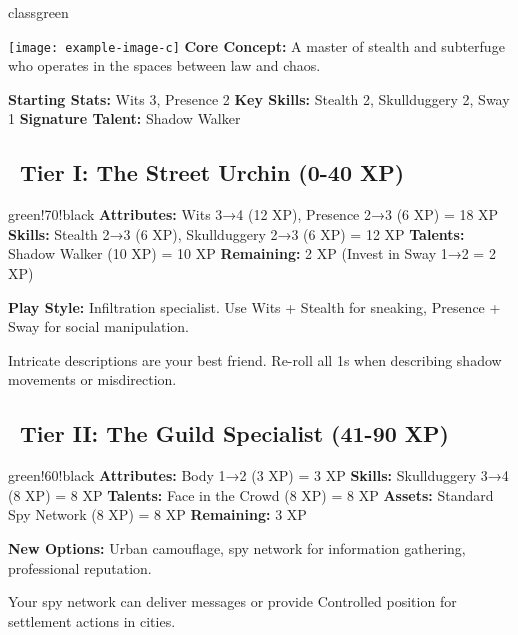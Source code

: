 \documentclass[11pt]{article}
\begin{document}
\newpage

\begin{classguide}{classgreen}
\begin{multicols}{2}
\texttt{[image: example-image-c]}
\columnbreak
\textbf{Core Concept:} A master of stealth and subterfuge who operates in the spaces between law and chaos.

\textbf{Starting Stats:} Wits 3, Presence 2
\textbf{Key Skills:} Stealth 2, Skullduggery 2, Sway 1
\textbf{Signature Talent:} Shadow Walker
\end{multicols}

\subsection*{\faStar\ Tier I: The Street Urchin (0-40 XP)}
\begin{tierbox}{green!70!black}
\textbf{Attributes:} Wits 3→4 (12 XP), Presence 2→3 (6 XP) = 18 XP
\textbf{Skills:} Stealth 2→3 (6 XP), Skullduggery 2→3 (6 XP) = 12 XP
\textbf{Talents:} Shadow Walker (10 XP) = 10 XP
\textbf{Remaining:} 2 XP (Invest in Sway 1→2 = 2 XP)
\end{tierbox}

\textbf{Play Style:} Infiltration specialist. Use Wits + Stealth for sneaking, Presence + Sway for social manipulation.

\begin{tipbox}
Intricate descriptions are your best friend. Re-roll all 1s when describing shadow movements or misdirection.
\end{tipbox}

\subsection*{\faStar\faStar\ Tier II: The Guild Specialist (41-90 XP)}
\begin{tierbox}{green!60!black}
\textbf{Attributes:} Body 1→2 (3 XP) = 3 XP
\textbf{Skills:} Skullduggery 3→4 (8 XP) = 8 XP
\textbf{Talents:} Face in the Crowd (8 XP) = 8 XP
\textbf{Assets:} Standard Spy Network (8 XP) = 8 XP
\textbf{Remaining:} 3 XP
\end{tierbox}

\textbf{New Options:} Urban camouflage, spy network for information gathering, professional reputation.

\begin{tipbox}
Your spy network can deliver messages or provide Controlled position for settlement actions in cities.
\end{tipbox}
\end{classguide}
\end{document}
